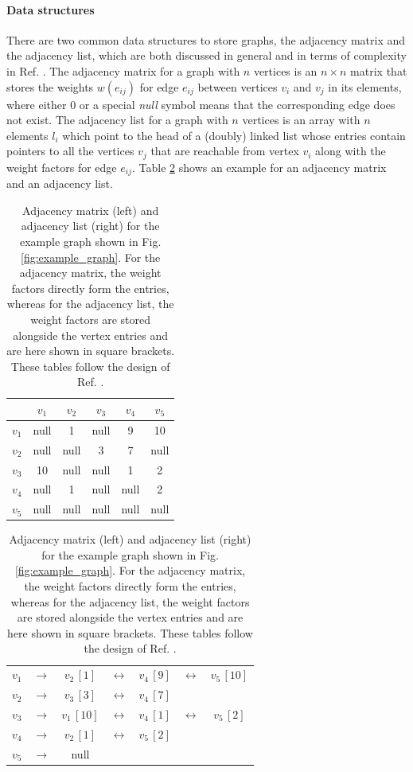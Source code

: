\paragraph{Data structures}
There are two common data structures to store graphs, the adjacency matrix and the adjacency list, which are
both discussed in general and in terms of complexity in Ref. \cite[pp. 3-5]{FUH_algo_graphs_2021}.
The adjacency matrix for a graph with $n$ vertices is an $n \times n$ matrix that stores the 
weights $w\left(e_{ij}\right)$ for edge $e_{ij}$ between vertices $v_i$ and $v_j$ in its elements,
where either $0$ or a special \textit{null} symbol means that the corresponding edge does not exist.
The adjacency list for a graph with $n$ vertices is an array with $n$ elements $l_i$ which point 
to the head of a (doubly) linked list whose entries contain pointers to all the vertices $v_j$ that are reachable 
from vertex $v_i$ along with the weight factors for edge $e_{ij}$.
Table \ref{tab:example_graph_structure} shows an example for an adjacency matrix and an adjacency list.

\begin{table}[h]
	\centering
	\begin{tabular}{|c|ccccc|}
			\hline
			      & $v_1$ & $v_2$ & $v_3$ & $v_4$ & $v_5$ \tabularnewline
			\hline
			$v_1$ &  null &     1 &  null &     9 &    10 \tabularnewline
			$v_2$ &  null &  null &     3 &     7 &  null \tabularnewline
			$v_3$ &    10 &  null &  null &     1 &     2 \tabularnewline
			$v_4$ &  null &     1 &  null &  null &     2 \tabularnewline
			$v_5$ &  null &  null &  null &  null &  null \tabularnewline
			\hline
	\end{tabular}
	\hspace{1cm}
	\begin{tabular}{|c|c|ccccc|}
			\cline{1-1} \cline{3-7}
			$v_1$ &  $\rightarrow$ &  $v_2\, [1]$ &  $\leftrightarrow$ &  $v_4\, [9]$ &  $\leftrightarrow$  & $v_5\, [10]$ \tabularnewline
			\cline{1-1} \cline{3-7}
			$v_2$ &  $\rightarrow$ &  $v_3\, [3]$ &  $\leftrightarrow$ &  $v_4\, [7]$ &   &  \tabularnewline
			\cline{1-1} \cline{3-7}
			$v_3$ &  $\rightarrow$ &  $v_1\, [10]$ &  $\leftrightarrow$ &  $v_4\, [1]$ &  $\leftrightarrow$  & $v_5\, [2]$ \tabularnewline
			\cline{1-1} \cline{3-7}
			$v_4$ &  $\rightarrow$ &  $v_2\, [1]$ & $\leftrightarrow$  &  $v_5\, [2]$ &   &  \tabularnewline
			\cline{1-1} \cline{3-7}
			$v_5$ &  $\rightarrow$ & null &   &   &   &  \tabularnewline
			\cline{1-1} \cline{3-7}
	\end{tabular}
	\caption[Adjacency matrix and list.]{
		Adjacency matrix (left) and adjacency list (right) for the example graph shown in Fig. \ref{fig:example_graph}.
		For the adjacency matrix, the weight factors directly form the entries, whereas for the adjacency list, 
		the weight factors are stored alongside the vertex entries and are here shown in square brackets.
		These tables follow the design of Ref. \cite[pp. 4, table 4.1]{FUH_algo_graphs_2021}.}
	\label{tab:example_graph_structure}
\end{table}



